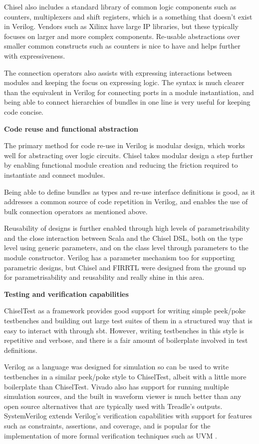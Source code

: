 Chisel also includes a standard library of common logic components such as counters, multiplexers and shift registers, which is a something that doesn't exist in Verilog. Vendors such as Xilinx have large IP libraries, but these typically focuses on larger and more complex components. Re-usable abstractions over smaller common constructs such as counters is nice to have and helps further with expressiveness.

The connection operators also assists with expressing interactions between modules and keeping the focus on expressing logic. The syntax is much clearer than the equivalent in Verilog for connecting ports in a module instantiation, and being able to connect hierarchies of bundles in one line is very useful for keeping code concise.

\textbf{Code reuse and functional abstraction}

The primary method for code re-use in Verilog is modular design, which works well for abstracting over logic circuits. Chisel takes modular design a step further by enabling functional module creation and reducing the friction required to instantiate and connect modules.

Being able to define bundles as types and re-use interface definitions is good, as it addresses a common source of code repetition in Verilog, and enables the use of bulk connection operators as mentioned above.

Reusability of designs is further enabled through high levels of parametrisability and the close interaction between Scala and the Chisel DSL, both on the type level using generic parameters, and on the class level through parameters to the module constructor. Verilog has a parameter mechanism too for supporting parametric designs, but Chisel and FIRRTL were designed from the ground up for parametrisability and reusability \cite{chisel, firrtl} and really shine in this area.

\textbf{Testing and verification capabilities}

ChiselTest as a framework provides good support for writing simple peek/poke testbenches and building out large test suites of them in a structured way that is easy to interact with through sbt. However, writing testbenches in this style is repetitive and verbose, and there is a fair amount of boilerplate involved in test definitions.

Verilog as a language was designed for simulation so can be used to write testbenches in a similar peek/poke style to ChiselTest, albeit with a little more boilerplate than ChiselTest. Vivado also has support for running multiple simulation sources, and the built in waveform viewer is much better than any open source alternatives that are typically used with Treadle's outputs. SystemVerilog extends Verilog's verification capabilities with support for features such as constraints, assertions, and coverage, and is popular for the implementation of more formal verification techniques such as UVM \cite{spear_tumbush_2012,uvm}.

